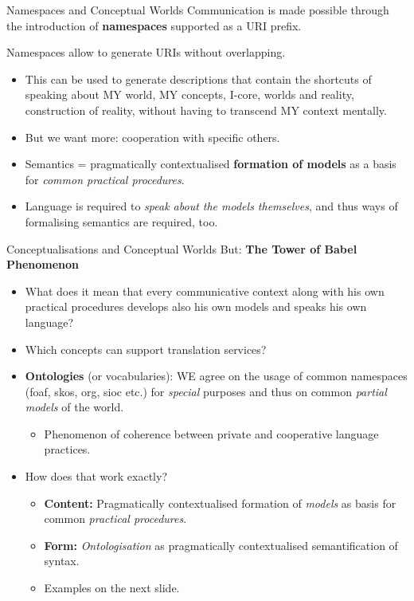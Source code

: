 \documentclass{beamer}
\begin{document}
\begin{frame}{Namespaces and Conceptual Worlds}
Communication is made possible through the introduction of \textbf{namespaces}
supported as a URI prefix.

Namespaces allow to generate URIs without overlapping.
\begin{itemize}
\item This can be used to generate descriptions that contain the shortcuts of
  speaking about MY world, MY concepts, I-core, worlds and reality,
  construction of reality, without having to transcend MY context mentally.
\item But we want more: cooperation with specific others.
\item Semantics = pragmatically contextualised \textbf{formation of models} as
  a basis for \emph{common practical procedures}.
\item Language is required to \emph{speak about the models themselves},
  and thus ways of formalising semantics are required, too.
\end{itemize}
\end{frame}

\begin{frame}{Conceptualisations and Conceptual Worlds}
But: \textbf{The Tower of Babel Phenomenon}
\begin{itemize}
\item What does it mean that every communicative context along with his own
  practical procedures develops also his own models and speaks his own
  language?
\item Which concepts can support translation services?
\item \textbf{Ontologies} (or vocabularies): WE agree on the usage of common
  namespaces (foaf, skos, org, sioc etc.) for \emph{special} purposes and thus
  on common \emph{partial models} of the world.
  \begin{itemize}
  \item Phenomenon of coherence between private and cooperative language
    practices.
  \end{itemize}
\item How does that work exactly?
  \begin{itemize}
  \item \textbf{Content:} Pragmatically contextualised formation of
    \emph{models} as basis for common \emph{practical procedures}.
  \item \textbf{Form:} \emph{Ontologisation} as pragmatically contextualised
    semantification of syntax.
  \item Examples on the next slide.
  \end{itemize}
\end{itemize}
\end{frame}
\end{document}
